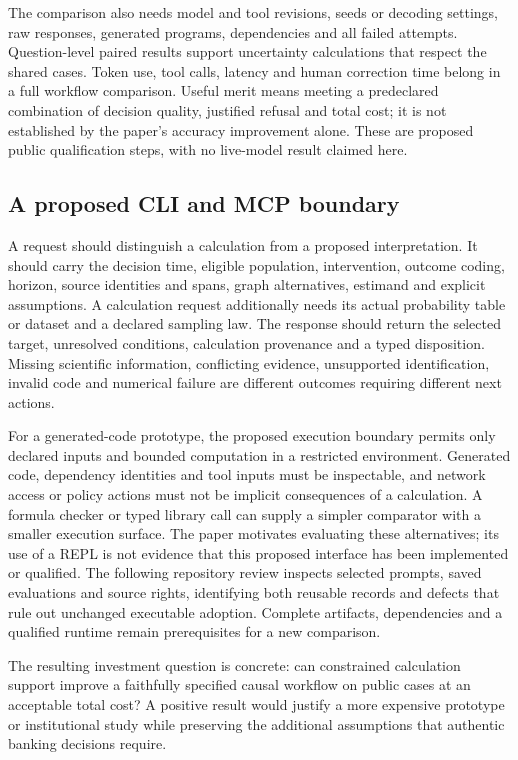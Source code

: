 The comparison also needs model and tool revisions, seeds or decoding settings,
raw responses, generated programs, dependencies and all failed attempts.
Question-level paired results support uncertainty calculations that respect the
shared cases. Token use, tool calls, latency and human correction time belong
in a full workflow comparison. Useful merit means meeting a predeclared
combination of decision quality, justified refusal and total cost; it is not
established by the paper's accuracy improvement alone. These are proposed
public qualification steps, with no live-model result claimed here.

\subsection{A proposed CLI and MCP boundary}
\label{exec21:prophets-contract}
A request should distinguish a calculation from a proposed interpretation. It
should carry the decision time, eligible population, intervention, outcome
coding, horizon, source identities and spans, graph alternatives, estimand and
explicit assumptions. A calculation request additionally needs its actual
probability table or dataset and a declared sampling law. The response should
return the selected target, unresolved conditions, calculation provenance and a
typed disposition. Missing scientific information, conflicting evidence,
unsupported identification, invalid code and numerical failure are different
outcomes requiring different next actions.

For a generated-code prototype, the proposed execution boundary permits only
declared inputs and bounded computation in a restricted environment. Generated
code, dependency identities and tool inputs must be inspectable, and network
access or policy actions must not be implicit consequences of a calculation.
A formula checker or typed library call can supply a simpler comparator with
a smaller execution surface. The paper motivates evaluating these alternatives;
its use of a REPL is not evidence that this proposed interface has been
implemented or qualified. The following repository review inspects selected prompts, saved evaluations and source rights, identifying both reusable records and defects that rule out unchanged executable adoption. Complete artifacts, dependencies and a qualified runtime remain prerequisites for a new comparison.
\citep{exec21_prophets}

The resulting investment question is concrete: can constrained calculation
support improve a faithfully specified causal workflow on public cases at an
acceptable total cost? A positive result would justify a more expensive
prototype or institutional study while preserving the additional assumptions
that authentic banking decisions require.


